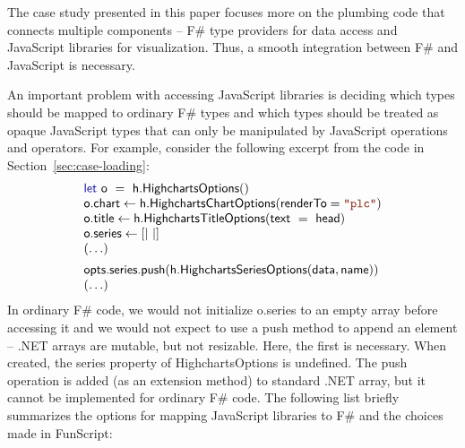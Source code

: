 \documentclass[submission,copyright,creativecommons]{eptcs}
\newcommand{\kvd}[1]{\textnormal{\textcolor{kvdclr}{\sffamily #1}}}
\newcommand{\str}[1]{\textnormal{\textcolor{strclr}{\ttfamily "#1"}}}
\newcommand{\ident}[1]{\textnormal{\sffamily #1}}
\begin{document}
The case study presented in this paper focuses more on the plumbing code that connects multiple
components -- F\# type providers for data access and JavaScript libraries for visualization. Thus,
a smooth integration between F\# and JavaScript is necessary.

An important problem with accessing JavaScript libraries is deciding which types should be 
mapped to ordinary F\# types and which types should be treated as opaque JavaScript types that
can only be manipulated by JavaScript operations and operators. For example, consider the following
excerpt from the code in Section~\ref{sec:case-loading}:
%
\begin{equation*}
\begin{array}{lll} 
 \kvd{let}~\ident{o}~=~\ident{h.HighchartsOptions}() \\
 \ident{o.chart} \leftarrow \ident{h.HighchartsChartOptions}(\ident{renderTo}=\str{plc}) \\
 \ident{o.title} \leftarrow \ident{h.HighchartsTitleOptions}(\ident{text}~=~\ident{head}) \\
 \ident{o.series} \leftarrow \lbrack| ~ |\rbrack \\
 (\ldots)
 \\[0.5em]   
 \ident{opts.series.push}(\ident{h.HighchartsSeriesOptions}(\ident{data}, \ident{name}))  \\
 (\ldots)
\end{array}
\end{equation*}
%
In ordinary F\# code, we would not initialize \ident{o.series} to an empty array before 
accessing it and we would not expect to use a \ident{push} method to append an element --
.NET arrays are mutable, but not resizable. Here, the first is necessary. When created, 
the \ident{series} property of \ident{HighchartsOptions} is \kvd{undefined}. The \ident{push}
operation is added (as an extension method) to standard .NET array, but it cannot be 
implemented for ordinary F\# code. The following list briefly summarizes the options for
mapping JavaScript libraries to F\# and the choices made in FunScript:
\end{document}

